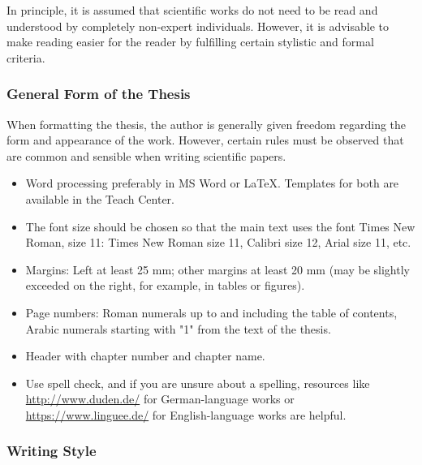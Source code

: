 \documentclass[a4paper, fleqn, headsepline, footsepline, 12pt, parskip=half]{scrartcl}
\begin{document}
In principle, it is assumed that scientific works do not need to be read and understood by completely non-expert individuals. However, it is advisable to make reading easier for the reader by fulfilling certain stylistic and formal criteria.


\subsubsection{General Form of the Thesis}
\label{sec:generalFormOfTheThesis}

When formatting the thesis, the author is generally given freedom regarding the form and appearance of the work. However, certain rules must be observed that are common and sensible when writing scientific papers.

\begin{itemize}
    \item Word processing preferably in MS Word or LaTeX. Templates for both are available in the Teach Center.
    \item The font size should be chosen so that the main text uses the font Times New Roman, size 11: Times New Roman size 11, Calibri size 12, Arial size 11, etc.
    \item Margins: Left at least 25 mm; other margins at least 20 mm (may be slightly exceeded on the right, for example, in tables or figures).
    \item Page numbers: Roman numerals up to and including the table of contents, Arabic numerals starting with "1" from the text of the thesis.
    \item Header with chapter number and chapter name.
    \item Use spell check, and if you are unsure about a spelling, resources like \url{http://www.duden.de/} for German-language works or \url{https://www.linguee.de/} for English-language works are helpful.
\end{itemize}


\subsubsection{Writing Style}
\label{sec:writingStyle}
\end{document}
